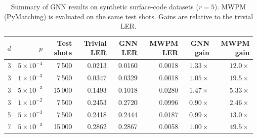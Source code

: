 \begin{table}[htbp]
\centering
\caption{Summary of GNN results on synthetic surface-code datasets ($r=5$). MWPM (PyMatching) is evaluated on the same test shots. Gains are relative to the trivial LER.}
\label{tab:gnn-surface-code}
\begin{tabular}{rrrrrrrr}
\hline
$d$ & $p$ & Test shots & Trivial LER & GNN LER & MWPM LER & GNN gain & MWPM gain \\
\hline
3 & $5\times 10^{-4}$ & 7\,500 & 0.0213 & 0.0160 & 0.0018 & $1.33\times$ & $12.0\times$ \\
3 & $1\times 10^{-3}$ & 7\,500 & 0.0347 & 0.0329 & 0.0018 & $1.05\times$ & $19.5\times$ \\
3 & $5\times 10^{-3}$ & 15\,000 & 0.1493 & 0.1018 & 0.0280 & $1.47\times$ & $5.33\times$ \\
3 & $1\times 10^{-2}$ & 7\,500 & 0.2453 & 0.2720 & 0.0996 & $0.90\times$ & $2.46\times$ \\
5 & $5\times 10^{-3}$ & 7\,500 & 0.2418 & 0.2444 & 0.0187 & $0.99\times$ & $13.0\times$ \\
7 & $5\times 10^{-3}$ & 15\,000 & 0.2862 & 0.2867 & 0.0058 & $1.00\times$ & $49.5\times$ \\
\hline
\end{tabular}
\end{table}
